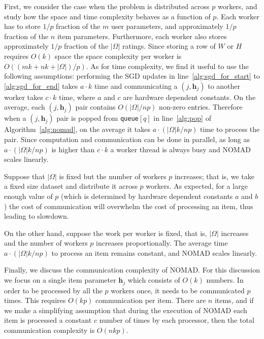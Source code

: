 \documentclass{vldb}
\newcommand{\hb}{\mathbf{h}}
\newcommand{\rbr}[1]{\left(#1\right)}
\newcommand{\abr}[1]{\left|#1\right|}
\begin{document}
First, we consider the case when the problem is distributed across $p$
workers, and study how the space and time complexity behaves as a
function of $p$. Each worker has to store $1/p$ fraction of the $m$ user
parameters, and approximately $1/p$ fraction of the $n$ item
parameters. Furthermore, each worker also stores approximately $1/p$
fraction of the $\abr{\Omega}$ ratings. Since storing a row of $W$ or
$H$ requires $O(k)$ space the space complexity per worker is
$O((mk+nk+\abr{\Omega})/p)$. As for time complexity, we find it useful
to use the following assumptions: performing the SGD updates in
line~\ref{alg:sgd_for_start} to \ref{alg:sgd_for_end} takes $a \cdot k$
time and communicating a $(j, \hb_j)$ to another worker takes $c \cdot
k$ time, where $a$ and $c$ are hardware dependent constants.  On the
average, each $(j, \hb_j)$ pair contains $O\rbr{\abr{\Omega}/np}$
non-zero entries.  Therefore when a $(j, \hb_{j})$ pair is popped from
\texttt{queue}$[q]$ in line~\ref{alg:pop} of Algorithm~\ref{alg:nomad},
on the average it takes $a \cdot \rbr{\abr{\Omega} k/np}$ time to
process the pair.  Since computation and communication can be done in
parallel, as long as $a \cdot \rbr{\abr{\Omega} k/np}$ is higher than $c
\cdot k$ a worker thread is always busy and NOMAD scales linearly.




Suppose that $\abr{\Omega}$ is fixed but the number of workers $p$
increases; that is, we take a fixed size dataset and distribute it
across $p$ workers. As expected, for a large enough value of $p$
(which is determined by hardware dependent constants $a$ and $b$) the
cost of communication will overwhelm the cost of processing an item,
thus leading to slowdown.

On the other hand, suppose the work per worker is fixed, that is,
$\abr{\Omega}$ increases and the number of workers $p$ increases
proportionally. The average time $a \cdot \rbr{\abr{\Omega} k /np}$ to
process an item remains constant, and NOMAD scales linearly.

Finally, we discuss the communication complexity of NOMAD. For this
discussion we focus on a single item parameter $\hb_j$ which consists
of $O(k)$ numbers. In order to be processed by all the $p$ workers
once, it needs to be communicated $p$ times. This requires $O(kp)$
communication per item. There are $n$ items, and if we make a
simplifying assumption that during the execution of NOMAD each item is
processed a constant $c$ number of times by each processor, then the
total communication complexity is $O(nkp)$.
\end{document}

